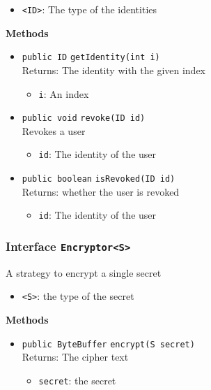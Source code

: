 \begin{itemize}
\item \lstinline|<ID>|: The type of the identities
\end{itemize}



\textbf{Methods}
\begin{itemize}
\item \lstinline|public ID| \lstinline|getIdentity|\lstinline|(int i)|\\
Returns: The identity with the given index
\begin{itemize}
\item \lstinline|i|: An index
\end{itemize}



\item \lstinline|public void| \lstinline|revoke|\lstinline|(ID id)|\\
Revokes a user
\begin{itemize}
\item \lstinline|id|: The identity of the user
\end{itemize}



\item \lstinline|public boolean| \lstinline|isRevoked|\lstinline|(ID id)|\\
Returns: whether the user is revoked
\begin{itemize}
\item \lstinline|id|: The identity of the user
\end{itemize}



\end{itemize}

\subsubsection{Interface \lstinline|Encryptor<S>|}
A strategy to encrypt a single secret \\


\begin{itemize}
\item \lstinline|<S>|: the type of the secret
\end{itemize}



\textbf{Methods}
\begin{itemize}
\item \lstinline|public ByteBuffer| \lstinline|encrypt|\lstinline|(S secret)|\\
Returns: The cipher text
\begin{itemize}
\item \lstinline|secret|: the secret
\end{itemize}



\end{itemize}

